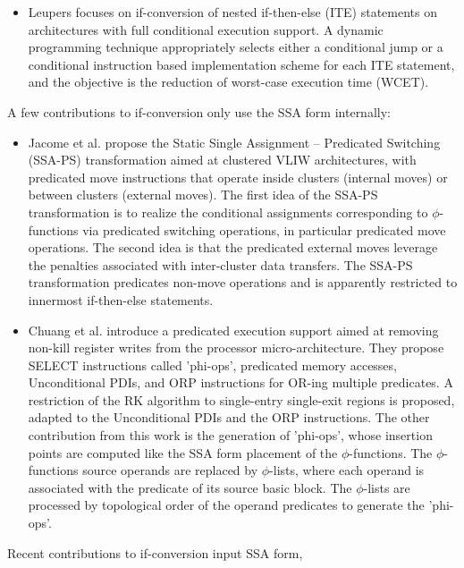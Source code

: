 \begin{itemize}
\item Leupers \cite{Leupers:1999:DATE} focuses on if-conversion of nested
if-then-else (ITE) statements on architectures with full conditional execution
support. A dynamic programming technique appropriately selects either a
conditional jump or a conditional instruction based implementation scheme for
each ITE statement, and the objective is the reduction of worst-case execution
time (WCET).

\end{itemize} A few contributions to if-conversion only use the SSA form
internally: \begin{itemize}

\item Jacome et al. \cite{Jacome:2001:DAC} propose the Static Single Assignment
-- Predicated Switching (SSA-PS) transformation aimed at clustered VLIW
architectures, with predicated move instructions that operate inside clusters
(internal moves) or between clusters (external moves). The first idea of the
SSA-PS transformation is to realize the conditional assignments corresponding to
$\phi$-functions via predicated switching operations, in particular predicated
move operations. The second idea is that the predicated external moves leverage
the penalties associated with inter-cluster data transfers. The SSA-PS
transformation predicates non-move operations and is apparently restricted to
innermost if-then-else statements.

\item Chuang et al. \cite{Chuang:2003:CGO} introduce a predicated execution
support aimed at removing non-kill register writes from the processor
micro-architecture. They propose SELECT instructions called 'phi-ops',
predicated memory accesses, Unconditional PDIs, and ORP instructions for OR-ing
multiple predicates. A restriction of the RK algorithm to single-entry
single-exit regions is proposed, adapted to the Unconditional PDIs and the ORP
instructions. The other contribution from this work is the generation of
'phi-ops', whose insertion points are computed like the SSA form placement of the
$\phi$-functions. The $\phi$-functions source operands are replaced by
$\phi$-lists, where each operand is associated with the predicate of
its source basic block. The $\phi$-lists are processed by topological order of
the operand predicates to generate the 'phi-ops'.

\end{itemize} Recent contributions to if-conversion input SSA form,
